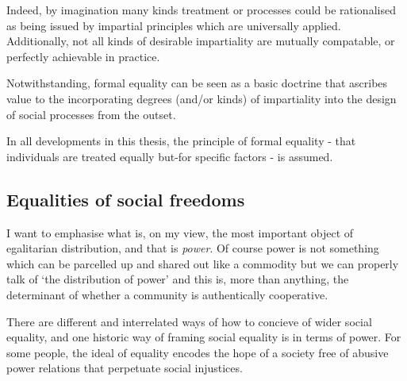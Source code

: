 Indeed, by imagination many kinds treatment or processes could be rationalised as being issued by impartial principles which are universally applied. Additionally, not all kinds of desirable impartiality are mutually compatable, or perfectly achievable in practice.\cite{Hutchinson_2019}

Notwithstanding, formal equality can be seen as a basic doctrine that ascribes value to the incorporating degrees (and/or kinds) of impartiality into the design of social processes from the outset.%

In all developments in this thesis, the principle of formal equality - that individuals are treated equally but-for specific factors - is assumed.

\subsection{Equalities of social freedoms}

\begin{displayquote}
I want to emphasise what is, on my view, the most important object of egalitarian distribution, and that is \textit{power}. Of course power is not something which can be parcelled up and shared out like a commodity but we can properly talk of `the distribution of power' and this is, more than anything, the determinant of whether a community is authentically cooperative.\cite{TheSocialBasisofEquality:1998}
\end{displayquote}

There are different and interrelated ways of how to concieve of wider social equality, and one historic way of framing social equality is in terms of power.
For some people, the ideal of equality encodes the hope of a society free of abusive power relations that perpetuate social injustices.

